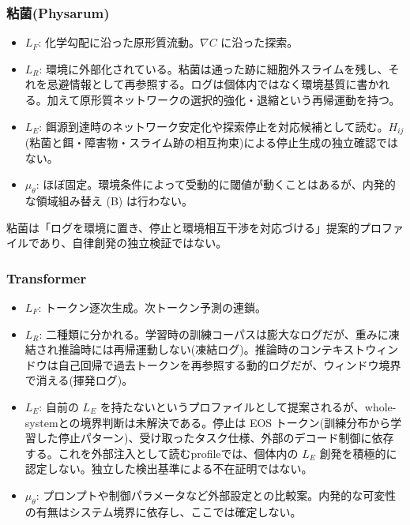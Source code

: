 \subsubsection{粘菌(Physarum)}


\begin{itemize}
\item \textbf{$L_F$}: 化学勾配に沿った原形質流動。$\nabla C$ に沿った探索。
\item \textbf{$L_R$}: 環境に外部化されている。粘菌は通った跡に細胞外スライムを残し、それを忌避情報として再参照する。ログは個体内ではなく環境基質に書かれる。加えて原形質ネットワークの選択的強化・退縮という再帰運動を持つ。
\item \textbf{$L_E$}: 餌源到達時のネットワーク安定化や探索停止を対応候補として読む。$H_{ij}$(粘菌と餌・障害物・スライム跡の相互拘束)による停止生成の独立確認ではない。
\item \textbf{$\mu_\theta$}: ほぼ固定。環境条件によって受動的に閾値が動くことはあるが、内発的な領域組み替え (B) は行わない。
\end{itemize}


粘菌は「ログを環境に置き、停止と環境相互干渉を対応づける」提案的プロファイルであり、自律創発の独立検証ではない。

\subsubsection{Transformer}


\begin{itemize}
\item \textbf{$L_F$}: トークン逐次生成。次トークン予測の連鎖。
\item \textbf{$L_R$}: 二種類に分かれる。学習時の訓練コーパスは膨大なログだが、重みに凍結され推論時には再帰運動しない(凍結ログ)。推論時のコンテキストウィンドウは自己回帰で過去トークンを再参照する動的ログだが、ウィンドウ境界で消える(揮発ログ)。
\item \textbf{$L_E$}: 自前の $L_E$ を持たないというプロファイルとして提案されるが、whole-systemとの境界判断は未解決である。停止は EOS トークン(訓練分布から学習した停止パターン)、受け取ったタスク仕様、外部のデコード制御に依存する。これを外部注入として読むprofileでは、個体内の $L_E$ 創発を積極的に認定しない。独立した検出基準による不在証明ではない。
\item \textbf{$\mu_\theta$}: プロンプトや制御パラメータなど外部設定との比較案。内発的な可変性の有無はシステム境界に依存し、ここでは確定しない。
\end{itemize}


